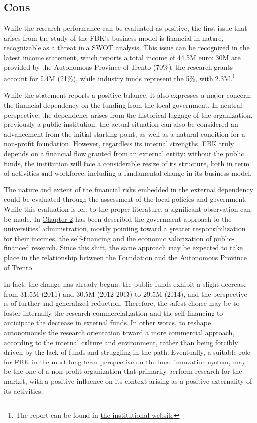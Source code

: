 \subsection{Cons}

While the research performance can be evaluated as positive, the first issue that arises from the study of the FBK's business model is financial in nature, recognizable as a threat in a SWOT analysis. This issue can be recognized in the latest income statement, which reports a total income of 44.5M euro: 30M are provided by the Autonomous Province of Trento (70\%), the research grants account for 9.4M (21\%), while industry funds represent the 5\%, with 2.3M.\footnote{The report can be found in \href{https://trasparenza.fbk.eu/Bilanci/Bilancio-preventivo-e-consuntivo}{the institutional website}}

While the statement reports a positive balance, it also expresses a major concern: the financial dependency on the funding from the local government. In neutral perspective, the dependence arises from the historical luggage of the organization, previously a public institution; the actual situation can also be considered an advancement from the initial starting point, as well as a natural condition for a non-profit foundation. However, regardless its internal strengths, FBK truly depends on a financial flow granted from an external entity: without the public funds, the institution will face a considerable resize of its structure, both in term of activities and workforce, including a fundamental change in its business model.

The nature and extent of the financial risks embedded in the external dependency could be evaluated through the assessment of the local policies and government. While this evaluation is left to the proper literature, a significant observation can be made. In \hyperref[Chapter2]{Chapter 2} has been described the government approach to the universities' administration, mostly pointing toward a greater responsibilization for their incomes, the self-financing and the economic valorization of public-financed research. Since this shift, the same approach may be expected to take place in the relationship between the Foundation and the Autonomous Province of Trento.

In fact, the change has already begun: the public funds exhibit a slight decrease from 31.5M (2011) and 30.5M (2012-2013) to 29.5M (2014), and the perspective is of further and generalized reduction. Therefore, the safest choice may be to foster internally the research commercialization and the self-financing to anticipate the decrease in external funds. In other words, to reshape autonomously the research orientation toward a more commercial approach, according to the internal culture and environment, rather than being forcibly driven by the lack of funds and struggling in the path. Eventually, a suitable role for FBK in the most long-term perspective on the local innovation system, may be the one of a non-profit organization that primarily perform research for the market, with a positive influence on its context arising as a positive externality of its activities.

